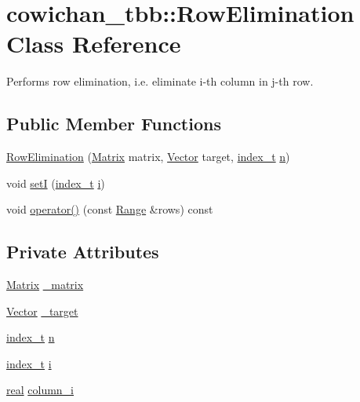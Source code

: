 \hypertarget{classcowichan__tbb_1_1_row_elimination}{
\section{cowichan\_\-tbb::RowElimination Class Reference}
\label{classcowichan__tbb_1_1_row_elimination}
}
Performs row elimination, i.e. eliminate i-th column in j-th row.  


\subsection*{Public Member Functions}
\begin{CompactItemize}
\item 
\hyperlink{classcowichan__tbb_1_1_row_elimination_917509da76905d645488e5f387ee9562}{RowElimination} (\hyperlink{cowichan_8hpp_3fb46f939e55c239fbc95656fc0f3399}{Matrix} matrix, \hyperlink{cowichan_8hpp_02bc1553e241b9b33408482658b3c355}{Vector} target, \hyperlink{cowichan_8hpp_5b04577d5d21124855deaad298595371}{index\_\-t} \hyperlink{classcowichan__tbb_1_1_row_elimination_1d7f660f2ff6859e63d43ff83558f319}{n})
\item 
void \hyperlink{classcowichan__tbb_1_1_row_elimination_66dfd8e6d7f31e8bfaa4dbd2782149ba}{setI} (\hyperlink{cowichan_8hpp_5b04577d5d21124855deaad298595371}{index\_\-t} \hyperlink{classcowichan__tbb_1_1_row_elimination_8e0b0b44136b0e0d5f61cd3017003574}{i})
\item 
void \hyperlink{classcowichan__tbb_1_1_row_elimination_1123e0c48e52628a0e543bbd75d2086f}{operator()} (const \hyperlink{cowichan__tbb_8hpp_8e2057f725b08f3a15513c378a453a47}{Range} \&rows) const 
\end{CompactItemize}
\subsection*{Private Attributes}
\begin{CompactItemize}
\item 
\hyperlink{cowichan_8hpp_3fb46f939e55c239fbc95656fc0f3399}{Matrix} \hyperlink{classcowichan__tbb_1_1_row_elimination_433177510f10b66e8062325e3f4fd6c3}{\_\-matrix}
\item 
\hyperlink{cowichan_8hpp_02bc1553e241b9b33408482658b3c355}{Vector} \hyperlink{classcowichan__tbb_1_1_row_elimination_1ba949c170d5f85582fc7ab968f28ac1}{\_\-target}
\item 
\hyperlink{cowichan_8hpp_5b04577d5d21124855deaad298595371}{index\_\-t} \hyperlink{classcowichan__tbb_1_1_row_elimination_1d7f660f2ff6859e63d43ff83558f319}{n}
\item 
\hyperlink{cowichan_8hpp_5b04577d5d21124855deaad298595371}{index\_\-t} \hyperlink{classcowichan__tbb_1_1_row_elimination_8e0b0b44136b0e0d5f61cd3017003574}{i}
\item 
\hyperlink{cowichan_8hpp_4d521b2c54a1f6312cc8fa04827eaf98}{real} \hyperlink{classcowichan__tbb_1_1_row_elimination_2d2d59f426efd3d2c16aa6f30db8b688}{column\_\-i}
\end{CompactItemize}


